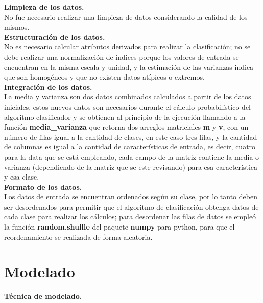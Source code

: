 \noindent
\textbf{Limpieza de los datos.}\\

No fue necesario realizar una limpieza de datos considerando la calidad de los mismos.\\

\noindent
\textbf{Estructuración de los datos.}\\

No es necesario calcular atributos derivados para realizar la clasificación; no se debe realizar
una normalización de índices porque los valores de entrada se encuentran en la misma escala y unidad, y la estimación de las varianzas indica que son homogéneos y que no existen datos atípicos o extremos.\\

\noindent
\textbf{Integración de los datos.}\\

La media y varianza son dos datos combinados calculados a partir de los datos iniciales, estos nuevos
datos son necesarios durante el cálculo probabilístico del algoritmo clasificador y se
obtienen al principio de la ejecución llamando a la función \textbf{media\_varianza} que retorna
dos arreglos matriciales \textbf{m} y \textbf{v}, con un número de filas igual a la cantidad de clases, en este caso tres filas,
y la cantidad de columnas es igual a la cantidad de características de entrada, es decir, cuatro
para la data que se está empleando, cada campo de la matriz contiene la media o varianza (dependiendo de la
matriz que se este revisando) para esa característica y esa clase.\\

\noindent
\textbf{Formato de los datos.}\\

Los datos de entrada se encuentran ordenados según su clase, por lo tanto deben ser desordenados para permitir que el algoritmo de clasificación obtenga datos de cada clase para realizar los cálculos; para desordenar las filas de datos se empleó la función \textbf{random.shuffle} del paquete \textbf{numpy} para python, para que el reordenamiento se realizada de forma aleatoria.\\

\section{Modelado}

\noindent
\textbf{Técnica de modelado.}\\

